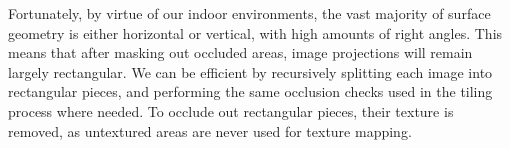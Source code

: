 \documentclass[10pt,twocolumn,letterpaper]{article}
\begin{document}
Fortunately, by virtue of our indoor environments, the vast majority
of surface geometry is either horizontal or vertical, with high
amounts of right angles. This means that after masking out occluded
areas, image projections will remain largely rectangular. We can be
efficient by recursively splitting each image into rectangular pieces,
and performing the same occlusion checks used in the tiling process
where needed. To occlude out rectangular pieces, their texture is
removed, as untextured areas are never used for texture mapping.
\end{document}

